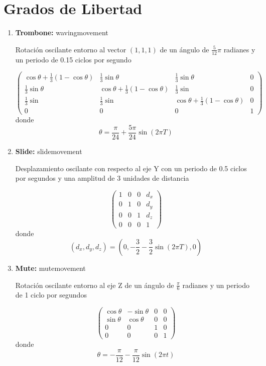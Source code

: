 \documentclass[10pt, a4paper]{article}
\begin{document}
\newpage

\section{Grados de Libertad}

\begin{enumerate}
	\item \textbf{Trombone:} wavingmovement
	
	Rotación oscilante entorno al vector $(1, 1, 1)$ de un ángulo de $\frac{5}{12} \pi$ radianes y un periodo de 0.15 ciclos por segundo

	\begin{equation*}
		\begin{pmatrix}
			\cos \theta + \frac{1}{3}(1 - \cos\theta) & \frac{1}{3} \sin \theta & \frac{1}{3} \sin \theta & 0 \\
			\frac{1}{3} \sin \theta & \cos \theta + \frac{1}{3}(1 - \cos \theta) & \frac{1}{3} \sin & 0 \\
			\frac{1}{3} \sin & \frac{1}{3} \sin & \cos \theta + \frac{1}{3} (1 - \cos \theta) & 0 \\
			0 & 0 & 0 & 1
		\end{pmatrix}
	\end{equation*}
	donde
	\begin{equation*}
		\theta = \frac{\pi}{24} + \frac{5\pi}{24} \sin(2 \pi T)
	\end{equation*}
	\item \textbf{Slide:} slidemovement
	
	Desplazamiento oscilante con respecto al eje Y con un periodo de 0.5 ciclos por segundos y una amplitud de 3 unidades de distancia

	\begin{equation*}
		\begin{pmatrix}
			1 & 0 & 0 & d_x \\
			0 & 1 & 0 & d_y \\
			0 & 0 & 1 & d_z \\
			0 & 0 & 0 & 1
		\end{pmatrix}
	\end{equation*}
	donde
	\begin{equation*}
		(d_x, d_y, d_z) = (0, -\frac{3}{2} - \frac{3}{2}\sin(2\pi T), 0)
	\end{equation*}
	\item \textbf{Mute:} mutemovement
	
	Rotación oscilante entorno al eje Z de un ángulo de $\frac{\pi}{6}$ radianes y un periodo de 1 ciclo por segundos

	\begin{equation*}
		\begin{pmatrix}
			\cos \theta & - \sin \theta & 0 & 0 \\
			\sin \theta & \cos \theta  & 0 & 0 \\
			0 & 0 & 1 & 0 \\
			0 & 0 & 0 & 1
		\end{pmatrix}
	\end{equation*}
	donde
	\begin{equation*}
		\theta = -\frac{\pi}{12} - \frac{\pi}{12}\sin(2 \pi t)
	\end{equation*}
\end{enumerate}
\end{document}
